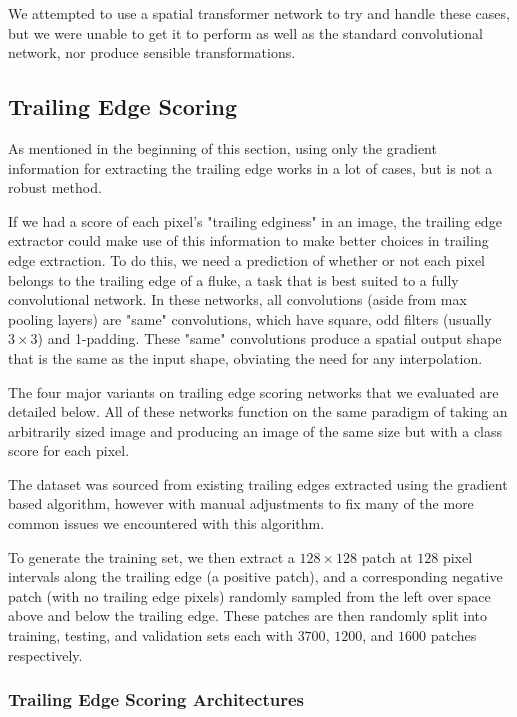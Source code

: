 We attempted to use a spatial transformer network\cite{jaderberg2015spatial} to try and handle these cases, but we were unable to get it to perform as well as the standard convolutional network, nor produce sensible transformations.

\subsection{Trailing Edge Scoring}

As mentioned in the beginning of this section, using only the gradient information for extracting the trailing edge works in a lot of cases, but is not a robust method.

If we had a score of each pixel's "trailing edginess" in an image, the trailing edge extractor could make use of this information to make better choices in trailing edge extraction.
To do this, we need a prediction of whether or not each pixel belongs to the trailing edge of a fluke, a task that is best suited to a fully convolutional network.
In these networks, all convolutions (aside from max pooling layers) are "same" convolutions, which have square, odd filters (usually $3 \times 3$) and 1-padding.
These "same" convolutions produce a spatial output shape that is the same as the input shape, obviating the need for any interpolation.

The four major variants on trailing edge scoring networks that we evaluated are detailed below.
All of these networks function on the same paradigm of taking an arbitrarily sized image and producing an image of the same size but with a class score for each pixel.

The dataset was sourced from existing trailing edges extracted using the gradient based algorithm, however with manual adjustments to fix many of the more common issues we encountered with this algorithm.

To generate the training set, we then extract a $128 \times 128$ patch at $128$ pixel intervals along the trailing edge (a positive patch), and a corresponding negative patch (with no trailing edge pixels) randomly sampled from the left over space above and below the trailing edge.
These patches are then randomly split into training, testing, and validation sets each with $3700$, $1200$, and $1600$ patches respectively.

\subsubsection{Trailing Edge Scoring Architectures}

